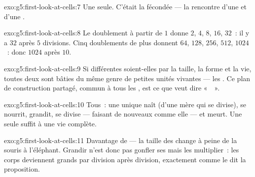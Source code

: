 \begin{solution}{exo:g5:first-look-at-cells:7}
Une seule. C'était la  fécondée --- la rencontre d'une
 et d'une .
\end{solution}

\begin{solution}{exo:g5:first-look-at-cells:8}
Le doublement à partir de $1$ donne $2$, $4$, $8$, $16$, $32$~: il y
a $32$  après $5$ divisions. Cinq doublements de plus
donnent $64$, $128$, $256$, $512$, $1024$~: donc $1024$ 
après $10$.
\end{solution}

\begin{solution}{exo:g5:first-look-at-cells:9}
Si différentes soient-elles par la taille, la forme et la vie,
toutes deux sont bâties du même genre de petites unités vivantes ---
les . Ce plan de construction partagé, commun à tous les
, est ce que veut dire «~~».
\end{solution}

\begin{solution}{exo:g5:first-look-at-cells:10}
Tous~: une  unique naît (d'une  mère qui se divise),
se nourrit, grandit, se divise --- faisant de nouveaux 
comme elle --- et meurt. Une seule  suffit à une vie
complète.
\end{solution}

\begin{solution}{exo:g5:first-look-at-cells:11}
Davantage de  --- la taille des  change à peine de
la souris à l'éléphant. Grandir n'est donc pas gonfler ses 
mais les multiplier~: les corps deviennent grands par division après
division, exactement comme le dit la proposition.
\end{solution}
